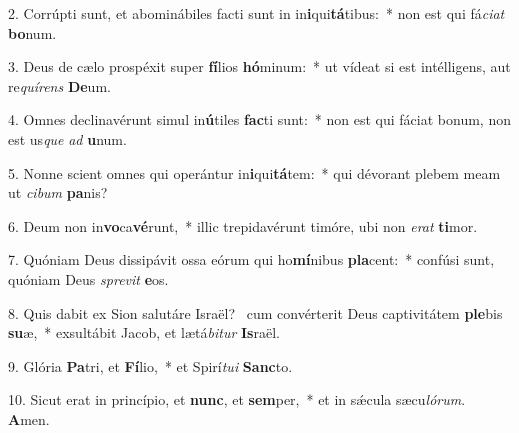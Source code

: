 2. Corrúpti sunt, et abominábiles facti sunt in in\textbf{i}qui\textbf{tá}tibus:~*  non est qui fá\textit{ci}\textit{at} \textbf{bo}num.\

3. Deus de cælo prospéxit super \textbf{fí}lios \textbf{hó}minum:~*  ut vídeat si est intélligens, aut re\textit{quí}\textit{rens} \textbf{De}um.\

4. Omnes declinavérunt simul in\textbf{ú}tiles \textbf{fac}ti sunt:~*  non est qui fáciat bonum, non est us\textit{que} \textit{ad} \textbf{u}num.\

5. Nonne scient omnes qui operántur in\textbf{i}qui\textbf{tá}tem:~*  qui dévorant plebem meam ut \textit{ci}\textit{bum} \textbf{pa}nis?\

6. Deum non in\textbf{vo}ca\textbf{vé}runt,~*  illic trepidavérunt timóre, ubi non \textit{e}\textit{rat} \textbf{ti}mor.\

7. Quóniam Deus dissipávit ossa eórum qui ho\textbf{mí}nibus \textbf{pla}cent:~*  confúsi sunt, quóniam Deus \textit{spre}\textit{vit} \textbf{e}os.\

8. Quis dabit ex Sion salutáre Israël? \dag\  cum convérterit Deus captivitátem \textbf{ple}bis \textbf{su}æ,~*  exsultábit Jacob, et lætá\textit{bi}\textit{tur} \textbf{Is}raël.\

9. Glória \textbf{Pa}tri, et \textbf{Fí}lio,~*  et Spirí\textit{tu}\textit{i} \textbf{Sanc}to.\

10. Sicut erat in princípio, et \textbf{nunc}, et \textbf{sem}per,~*  et in sǽcula sæcu\textit{ló}\textit{rum}. \textbf{A}men.\


